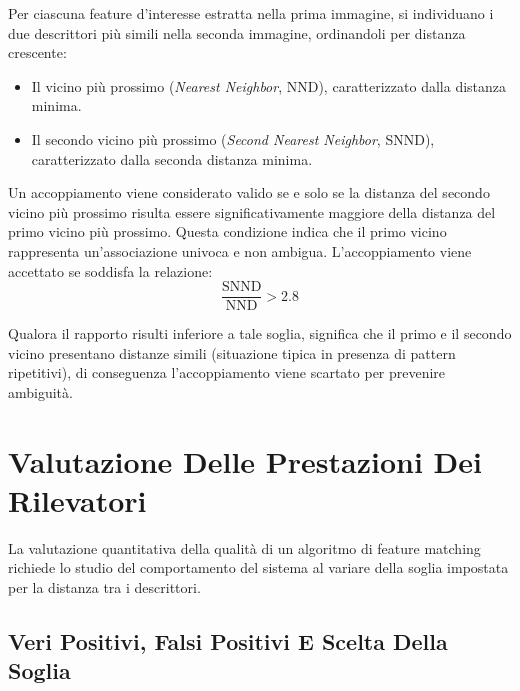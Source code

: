 ﻿\documentclass[11pt, a4paper]{article}
\begin{document}
Per ciascuna feature d'interesse estratta nella prima immagine, si individuano i due descrittori più simili nella seconda immagine, ordinandoli per distanza crescente:
\begin{itemize}
    \item Il vicino più prossimo (\emph{Nearest Neighbor}, NND), caratterizzato dalla distanza minima.
    \item Il secondo vicino più prossimo (\emph{Second Nearest Neighbor}, SNND), caratterizzato dalla seconda distanza minima.
\end{itemize}

Un accoppiamento viene considerato valido se e solo se la distanza del secondo vicino più prossimo risulta essere significativamente maggiore della distanza del primo vicino più prossimo. Questa condizione indica che il primo vicino rappresenta un'associazione univoca e non ambigua. L'accoppiamento viene accettato se soddisfa la relazione:
\[ \boxed{\frac{\text{SNND}}{\text{NND}} > 2.8} \]

Qualora il rapporto risulti inferiore a tale soglia, significa che il primo e il secondo vicino presentano distanze simili (situazione tipica in presenza di pattern ripetitivi), di conseguenza l'accoppiamento viene scartato per prevenire ambiguità.



\newpage

\section{Valutazione Delle Prestazioni Dei Rilevatori}

La valutazione quantitativa della qualità di un algoritmo di feature matching richiede lo studio del comportamento del sistema al variare della soglia impostata per la distanza tra i descrittori.


\subsection{Veri Positivi, Falsi Positivi E Scelta Della Soglia}
\end{document}
